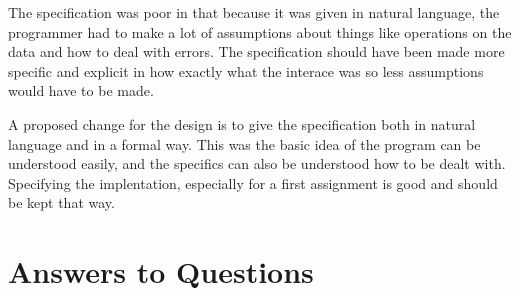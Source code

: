 \documentclass[12pt]{article}
\begin{document}
The specification was poor in that because it was given in natural language, the
programmer had to make a lot of assumptions about things like operations on the data
and how to deal with errors. The specification should have been made more specific
and explicit in how exactly what the interace was so less assumptions would have to be made.

A proposed change for the design is to give the specification both in natural language and
in a formal way. This was the basic idea of the program can be understood easily, and
the specifics can also be understood how to be dealt with. Specifying the implentation,
especially for a first assignment is good and should be kept that way.


\section{Answers to Questions}
\end{document}
